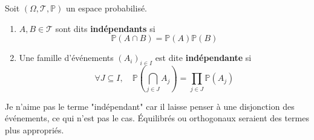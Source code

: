 \documentclass[a4paper, 12pt]{article}
\begin{document}
\begin{definition}
    Soit $(\Omega, \mathcal{T}, \mathbb{P})$ un espace probabilisé.

    \begin{enumerate}[label=(\alph*)]
        \item $A, B \in \mathcal{T}$ sont dits \textbf{indépendants} si
        $$
            \mathbb{P}(A \cap B) = \mathbb{P}(A) \mathbb{P}(B)
        $$
        \item Une famille d'événements $(A_i)_{i \in I}$ est dite \textbf{indépendante} si
        $$
            \forall J \subseteq I, \quad \mathbb{P}\left( \bigcap_{j \in J} A_j \right) = \prod_{j \in J} \mathbb{P}(A_j)
        $$
    \end{enumerate}
\end{definition}

\begin{commentaire}
    Je n'aime pas le terme "indépendant" car il laisse penser à une disjonction des événements, ce qui n'est pas le cas. Équilibrés ou orthogonaux seraient des termes plus appropriés.
\end{commentaire}
\end{document}
